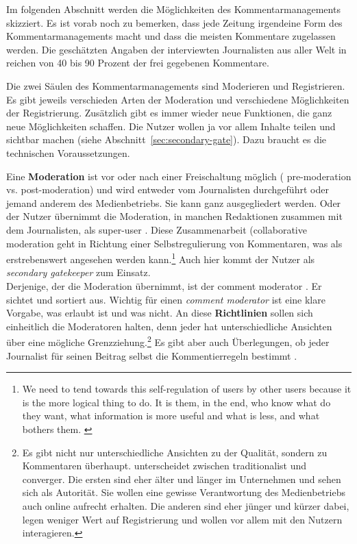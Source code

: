 Im folgenden Abschnitt werden die Möglichkeiten des Kommentarmanagements
skizziert. Es ist vorab noch zu bemerken, dass jede Zeitung irgendeine Form des
Kommentarmanagements macht und dass die meisten Kommentare zugelassen werden.
Die geschätzten Angaben der interviewten Journalisten aus aller Welt in
\textcite[S.~106]{singer} reichen von 40 bis 90 Prozent der frei gegebenen
Kommentare.

Die zwei Säulen des Kommentarmanagements sind Moderieren und Registrieren. Es
gibt jeweils verschieden Arten der Moderation und verschiedene Möglichkeiten der
Registrierung. Zusätzlich gibt es immer wieder neue Funktionen, die ganz neue
Möglichkeiten schaffen.  Die Nutzer wollen ja vor allem Inhalte teilen und
sichtbar machen (siehe Abschnitt~\ref{sec:secondary-gate}).
Dazu braucht es die technischen Voraussetzungen.

Eine {\bfseries Moderation} ist vor oder nach einer Freischaltung möglich (\glqq
pre-mo\-de\-ra\-tion\grqq{} vs. \glqq post-moderation\grqq) und wird entweder vom
Journalisten durchgeführt oder jemand anderem des Medienbetriebs. Sie kann ganz
ausgegliedert werden. Oder der Nutzer übernimmt die Moderation, in manchen
Redaktionen zusammen mit dem Journalisten, als \glqq super-user\grqq{}
\autocite[S.~112]{reich}. Diese Zusammenarbeit (\glqq collaborative
moderation\grqq{} \autocite[S.~109]{reich} geht in Richtung einer
Selbstregulierung von Kommentaren, was als erstrebenswert angesehen werden
kann.\footnote{\glqq We need to tend towards this self-regulation of users by other
users because it is the more logical thing to do. It is them, in the end, who
know what do they want, what information is more useful and what is less, and
what bothers them.\grqq\-  \autocite[S.~112]{reich}} Auch hier kommt der Nutzer als
\emph{secondary gatekeeper} zum Einsatz.\\
Derjenige, der die Moderation übernimmt, ist der \glqq comment moderator\grqq{}
\autocite[S.~68]{paulussen}. Er sichtet und sortiert aus. Wichtig für einen
{\slshape comment moderator} ist eine klare Vorgabe, was erlaubt ist und was
nicht. An diese {\bfseries Richtlinien} sollen sich einheitlich die Moderatoren
halten, denn jeder hat unterschiedliche Ansichten über eine mögliche
Grenzziehung.\footnote{Es gibt nicht nur unterschiedliche Ansichten zu der
Qualität, sondern zu Kommentaren überhaupt. \textcite{robinson} unterscheidet
zwischen \glqq traditionalist\grqq{} und \glqq converger\grqq{}. Die ersten
sind eher älter und länger im Unternehmen und sehen sich als Autorität. Sie
wollen eine gewisse Verantwortung des Medienbetriebs auch online aufrecht
erhalten. Die anderen sind eher jünger und kürzer dabei, legen weniger Wert
auf Registrierung und wollen vor allem mit den Nutzern interagieren.} Es gibt
aber auch Überlegungen, ob jeder Journalist für seinen Beitrag selbst die
Kommentierregeln bestimmt \autocite[S.~127]{singer}.

